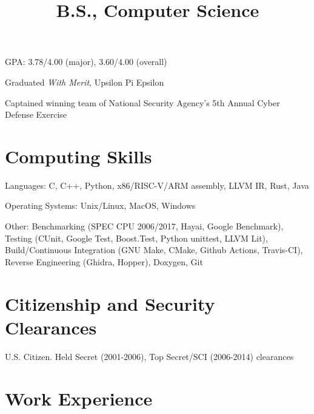 \documentclass[line]{res}
\begin{document}
\begin{resume}
\title{B.S., Computer Science}
\begin{position}
\vspace*{-.2cm}
\begin{list1}
	\item GPA: 3.78/4.00 (major), 3.60/4.00 (overall)
	\item Graduated {\it With Merit}, Upsilon Pi Epsilon
	\item Captained winning team of National Security Agency's 5th Annual Cyber Defense Exercise
\end{list1}
\end{position}

\section{Computing Skills}
\begin{list2}
\item Languages: C, C++, Python, x86/RISC-V/ARM assembly, LLVM IR, Rust, Java
\item Operating Systems: Unix/Linux, MacOS, Windows
\item Other: Benchmarking (SPEC CPU 2006/2017, Hayai, Google Benchmark), Testing (CUnit, Google Test, Boost.Test, Python unittest, LLVM Lit), Build/Continuous Integration (GNU Make, CMake, Github Actions, Travis-CI), Reverse Engineering (Ghidra, Hopper), Doxygen, Git
\end{list2}

\section{Citizenship and Security Clearances}
U.S. Citizen. Held {\sc Secret} (2001-2006), {\sc Top Secret/SCI} (2006-2014) clearances

\section{Work Experience}


\end{resume}
\end{document}
